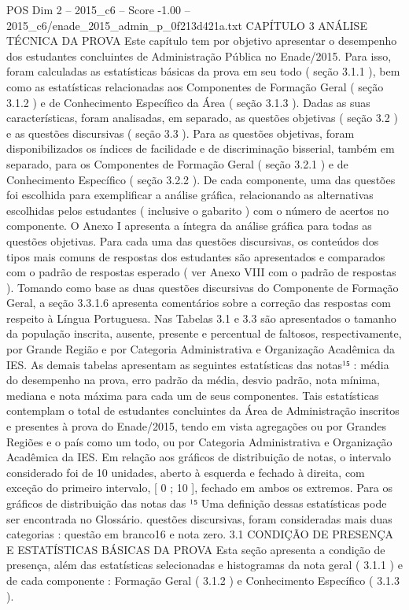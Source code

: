 \begin{textsample}{POS Dim 2 – 2015\_c6 – Score -1.00 – 2015\_c6/enade\_2015\_admin\_p\_0f213d421a.txt}  \label{ex:f2_pos_241}
CAPÍTULO 3 ANÁLISE TÉCNICA DA PROVA Este capítulo tem por objetivo apresentar o desempenho dos estudantes concluintes de Administração Pública no Enade/2015.
Para isso, foram calculadas as estatísticas básicas da prova em seu todo ( seção 3.1.1 ), bem como as estatísticas relacionadas aos Componentes de Formação Geral ( seção 3.1.2 ) e de Conhecimento Específico da Área ( seção 3.1.3 ).
Dadas as suas características, foram analisadas, em separado, as questões objetivas ( seção 3.2 ) e as questões discursivas ( seção 3.3 ).
Para as questões objetivas, foram disponibilizados os índices de facilidade e de discriminação bisserial, também em separado, para os Componentes de Formação Geral ( seção 3.2.1 ) e de Conhecimento Específico ( seção 3.2.2 ).
De cada componente, uma das questões foi escolhida para exemplificar a análise gráfica, relacionando as alternativas escolhidas pelos estudantes ( inclusive o gabarito ) com o número de acertos no componente.
O Anexo I apresenta a íntegra da análise gráfica para todas as questões objetivas.
Para cada uma das questões discursivas, os conteúdos dos tipos mais comuns de respostas dos estudantes são apresentados e comparados com o padrão de respostas esperado ( ver Anexo VIII com o padrão de respostas ).
Tomando como base as duas questões discursivas do Componente de Formação Geral, a seção 3.3.1.6 apresenta comentários sobre a correção das respostas com respeito à Língua Portuguesa.
Nas Tabelas 3.1 e 3.3 são apresentados o tamanho da população inscrita, ausente, presente e percentual de faltosos, respectivamente, por Grande Região e por Categoria Administrativa e Organização Acadêmica da IES.
As demais tabelas apresentam as seguintes estatísticas das notas¹⁵ : média do desempenho na prova, erro padrão da média, desvio padrão, nota mínima, mediana e nota máxima para cada um de seus componentes.
Tais estatísticas contemplam o total de estudantes concluintes da Área de Administração inscritos e presentes à prova do Enade/2015, tendo em vista agregações ou por Grandes Regiões e o país como um todo, ou por Categoria Administrativa e Organização Acadêmica da IES.
Em relação aos gráficos de distribuição de notas, o intervalo considerado foi de 10 unidades, aberto à esquerda e fechado à direita, com exceção do primeiro intervalo, [ 0 ; 10 ], fechado em ambos os extremos.
Para os gráficos de distribuição das notas das ¹⁵ Uma definição dessas estatísticas pode ser encontrada no Glossário. questões discursivas, foram consideradas mais duas categorias : questão em branco16 e nota zero. 3.1 CONDIÇÃO DE PRESENÇA E ESTATÍSTICAS BÁSICAS DA PROVA Esta seção apresenta a condição de presença, além das estatísticas selecionadas e histogramas da nota geral ( 3.1.1 ) e de cada componente : Formação Geral ( 3.1.2 ) e Conhecimento Específico ( 3.1.3 ).

\end{textsample}
